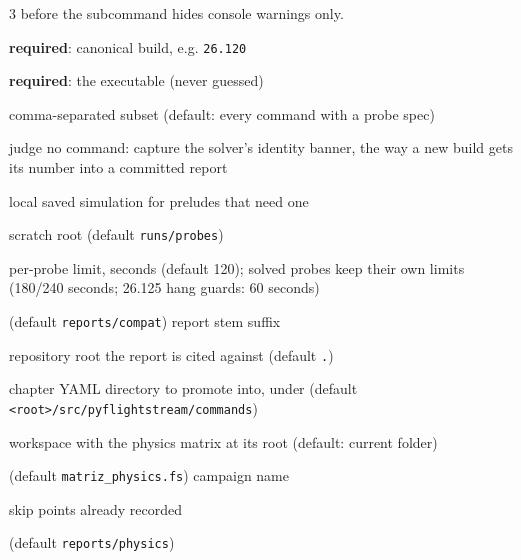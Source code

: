 \begin{multicols}{3}
 before the subcommand hides console warnings only.
\begin{flags}
\item {} \textbf{required}: canonical build, e.g. \texttt{26.120}
\item {} \textbf{required}: the executable (never guessed)
\item {} comma-separated subset (default: every command with a probe spec)
\item {} judge no command: capture the solver's identity banner, the way a new build gets its number into a committed report
\item {} local saved simulation for preludes that need one
\item {} scratch root (default \texttt{runs/probes})
\item {} per-probe limit, seconds (default 120); solved probes keep their own limits (180/240 seconds; 26.125 hang guards: 60 seconds)
\item {} (default \texttt{reports/compat}) \quad {} report stem suffix
\end{flags}
\begin{flags}
\item {} repository root the report is cited against (default \texttt{.})
\item {} chapter YAML directory to promote into, under  (default \texttt{<root>/src/pyflightstream/commands})
\end{flags}
\begin{flags}
\item {} workspace with the physics matrix at its root (default: current folder)
\item {} (default \texttt{matriz\_physics.fs}) \quad {} campaign name
\item {} skip points already recorded
\item {} (default \texttt{reports/physics}) \quad {}

\end{flags}
\end{multicols}
